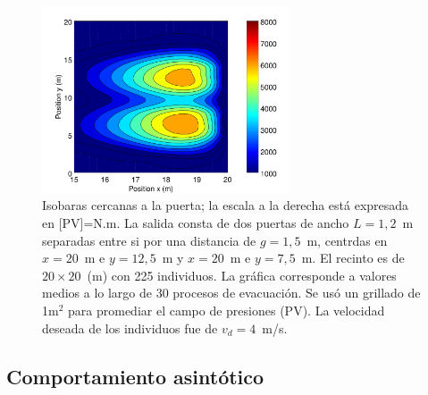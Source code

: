 \begin{figure}[H]
    \centering
    \includegraphics[height=5.5cm]{figuras/press_225p_v4_g5.png}			\caption[width=5cm]{Isobaras cercanas a la puerta; la escala a la derecha está expresada en [PV]=N.m. La salida consta de dos puertas de ancho $L=1,2$~m separadas entre si por una distancia de $g=1,5$~m, centrdas en $x=20$~m e $y=12,5$~m y $x=20$~m e $y=7,5$~m. El recinto es de $20\times 20$~(m) con 225 individuos. La gráfica corresponde a valores medios a lo largo de 30 procesos de evacuación. Se usó un grillado de 1m$^2$ para promediar el campo de presiones (PV). La velocidad deseada de los individuos fue de $v_d=4$~m/s.}
    \label{presion_225p_g5}
\end{figure}



\subsection{Comportamiento asintótico}


